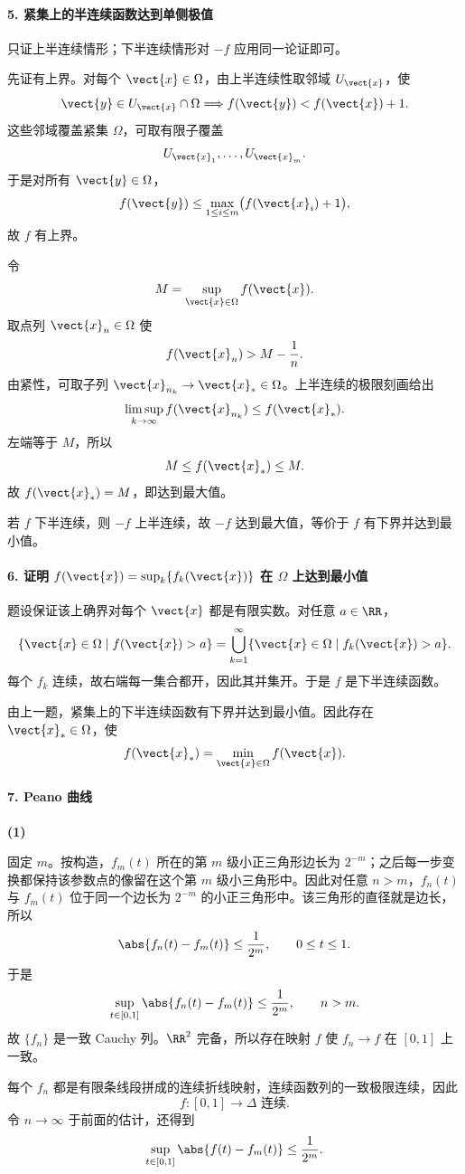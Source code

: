 \paragraph{5. 紧集上的半连续函数达到单侧极值}
\begin{xsolution}
只证上半连续情形；下半连续情形对 $-f$ 应用同一论证即可。

先证有上界。对每个 $\vect{x}\in\Omega$，由上半连续性取邻域 $U_{\vect{x}}$，使
\[
  \vect{y}\in U_{\vect{x}}\cap\Omega
  \Longrightarrow
  f(\vect{y})<f(\vect{x})+1.
\]
这些邻域覆盖紧集 $\Omega$，可取有限子覆盖
\[
  U_{\vect{x}_1},\ldots,U_{\vect{x}_m}.
\]
于是对所有 $\vect{y}\in\Omega$，
\[
  f(\vect{y})
  \le\max_{1\le i\le m}\bigl(f(\vect{x}_i)+1\bigr),
\]
故 $f$ 有上界。

令
\[
  M=\sup_{\vect{x}\in\Omega}f(\vect{x}).
\]
取点列 $\vect{x}_n\in\Omega$ 使
\[
  f(\vect{x}_n)>M-\frac1n.
\]
由紧性，可取子列 $\vect{x}_{n_k}\to\vect{x}_*\in\Omega$。上半连续的极限刻画给出
\[
  \limsup_{k\to\infty}f(\vect{x}_{n_k})
  \le f(\vect{x}_*).
\]
左端等于 $M$，所以
\[
  M\le f(\vect{x}_*)\le M.
\]
故 $f(\vect{x}_*)=M$，即达到最大值。

若 $f$ 下半连续，则 $-f$ 上半连续，故 $-f$ 达到最大值，等价于 $f$ 有下界并达到最小值。
\end{xsolution}

\paragraph{6. 证明 $f(\vect{x})=\sup_k\{f_k(\vect{x})\}$ 在 $\Omega$ 上达到最小值}
\begin{xsolution}
题设保证该上确界对每个 $\vect{x}$ 都是有限实数。对任意 $a\in\RR$，
\[
  \{\vect{x}\in\Omega\mid f(\vect{x})>a\}
  =\bigcup_{k=1}^\infty
  \{\vect{x}\in\Omega\mid f_k(\vect{x})>a\}.
\]
每个 $f_k$ 连续，故右端每一集合都开，因此其并集开。于是 $f$ 是下半连续函数。

由上一题，紧集上的下半连续函数有下界并达到最小值。因此存在 $\vect{x}_*\in\Omega$，使
\[
  f(\vect{x}_*)
  =\min_{\vect{x}\in\Omega}f(\vect{x}).
\]
\end{xsolution}

\paragraph{7. Peano 曲线}

\textbf{(1)}
\begin{xsolution}
固定 $m$。按构造，$f_m(t)$ 所在的第 $m$ 级小正三角形边长为 $2^{-m}$；之后每一步变换都保持该参数点的像留在这个第 $m$ 级小三角形中。因此对任意 $n>m$，$f_n(t)$ 与 $f_m(t)$ 位于同一个边长为 $2^{-m}$ 的小正三角形中。该三角形的直径就是边长，所以
\[
  \abs{f_n(t)-f_m(t)}\le\frac1{2^m},
  \qquad0\le t\le1.
\]
于是
\[
  \sup_{t\in[0,1]}\abs{f_n(t)-f_m(t)}
  \le\frac1{2^m},
  \qquad n>m.
\]
故 $\{f_n\}$ 是一致 Cauchy 列。$\RR^2$ 完备，所以存在映射 $f$ 使 $f_n\to f$ 在 $[0,1]$ 上一致。

每个 $f_n$ 都是有限条线段拼成的连续折线映射，连续函数列的一致极限连续，因此
\[
  \boxed{f\colon[0,1]\to\Delta\text{ 连续}}.
\]
令 $n\to\infty$ 于前面的估计，还得到
\[
  \sup_{t\in[0,1]}\abs{f(t)-f_m(t)}
  \le\frac1{2^m}.
\]
\end{xsolution}

